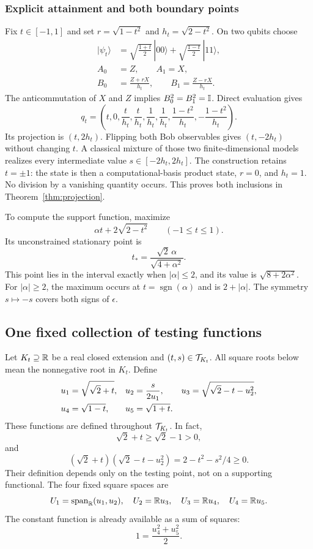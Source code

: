 \subsubsection{Explicit attainment and both boundary points}
Fix $t\in[-1,1]$ and set $r=\sqrt{1-t^2}$ and $h_t=\sqrt{2-t^2}$. On two qubits choose
\begin{align*}
 |\psi_t\rangle&=\sqrt{\frac{1+t}{2}}\,|00\rangle
                    +\sqrt{\frac{1-t}{2}}\,|11\rangle,\\
 A_0&=Z,\qquad A_1=X,\\
 B_0&=\frac{Z+rX}{h_t},\qquad B_1=\frac{Z-rX}{h_t}.
\end{align*}
The anticommutation of $X$ and $Z$ implies $B_0^2=B_1^2=\mathbb I$. Direct evaluation gives
\begin{equation}\label{eq:attainment}
 q_t=\left(t,0,\frac{t}{h_t},\frac{t}{h_t},
           \frac1{h_t},\frac1{h_t},
           \frac{1-t^2}{h_t},-\frac{1-t^2}{h_t}\right).
\end{equation}
Its projection is $(t,2h_t)$. Flipping both Bob observables gives $(t,-2h_t)$ without changing $t$. A classical mixture of those two finite-dimensional models realizes every intermediate value $s\in[-2h_t,2h_t]$. The construction retains $t=\pm1$: the state is then a computational-basis product state, $r=0$, and $h_t=1$. No division by a vanishing quantity occurs. This proves both inclusions in Theorem~\ref{thm:projection}.

To compute the support function, maximize
\[
 \alpha t+2\sqrt{2-t^2}\qquad(-1\le t\le1).
\]
Its unconstrained stationary point is
\[
 t_* =\frac{\sqrt2\,\alpha}{\sqrt{4+\alpha^2}}.
\]
This point lies in the interval exactly when $|\alpha|\le2$, and its value is $\sqrt{8+2\alpha^2}$. For $|\alpha|\ge2$, the maximum occurs at $t=\operatorname{sgn}(\alpha)$ and is $2+|\alpha|$. The symmetry $s\mapsto-s$ covers both signs of $\epsilon$.

\subsection{One fixed collection of testing functions}
Let $K_t\supseteq\mathbb R$ be a real closed extension and $(t,s)\in\mathcal T_{K_t}$. All square roots below mean the nonnegative root in $K_t$. Define
\begin{align}\label{eq:features}
 u_1&=\sqrt{\sqrt2+t},&
 u_2&=\frac{s}{2u_1},&
 u_3&=\sqrt{\sqrt2-t-u_2^2},\\
 u_4&=\sqrt{1-t},&u_5&=\sqrt{1+t}.&&\notag
\end{align}
These functions are defined throughout $\mathcal T_{K_t}$. In fact,
\[
 \sqrt2+t\ge\sqrt2-1>0,
\]
and
\[
 (\sqrt2+t)(\sqrt2-t-u_2^2)=2-t^2-s^2/4\ge0.
\]
Their definition depends only on the testing point, not on a supporting functional. The four fixed square spaces are
\[
 U_1=\operatorname{span}_{\mathbb R}(u_1,u_2),\quad
 U_2=\mathbb R u_3,\quad U_3=\mathbb R u_4,\quad U_4=\mathbb R u_5.
\]
The constant function is already available as a sum of squares:
\begin{equation}\label{eq:constant}
 1=\frac{u_4^2+u_5^2}{2}.
\end{equation}

